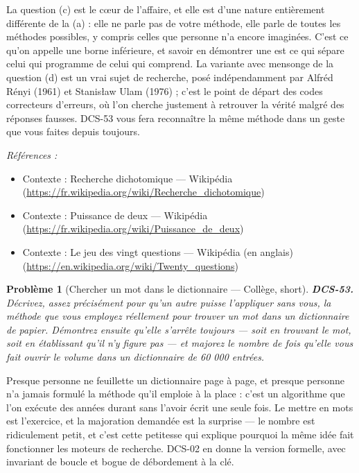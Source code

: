 \documentclass[11pt]{article}
\newtheorem{problem}{Problème}
\newenvironment{refs}{\par\small\noindent\emph{Références :}\begin{itemize}\setlength\itemsep{0pt}}{\end{itemize}\normalsize}
\begin{document}
\noindent La question (c) est le c\oe{}ur de l'affaire, et elle est d'une nature
entièrement différente de la (a) : elle ne parle pas de votre méthode, elle parle de toutes
les méthodes possibles, y compris celles que personne n'a encore imaginées. C'est ce qu'on
appelle une borne inférieure, et savoir en démontrer une est ce qui sépare celui qui
programme de celui qui comprend. La variante avec mensonge de la question (d) est un vrai
sujet de recherche, posé indépendamment par Alfréd Rényi (1961) et Stanis\l{}aw Ulam (1976) ;
c'est le point de départ des codes correcteurs d'erreurs, où l'on cherche justement à
retrouver la vérité malgré des réponses fausses. DCS-53 vous fera reconnaître la même
méthode dans un geste que vous faites depuis toujours.

\begin{refs}
\item Contexte : Recherche dichotomique --- Wikipédia (\url{https://fr.wikipedia.org/wiki/Recherche_dichotomique})
\item Contexte : Puissance de deux --- Wikipédia (\url{https://fr.wikipedia.org/wiki/Puissance_de_deux})
\item Contexte : Le jeu des vingt questions --- Wikipédia (en anglais) (\url{https://en.wikipedia.org/wiki/Twenty_questions})
\end{refs}

\bigskip

\begin{problem}[{Chercher un mot dans le dictionnaire --- Collège, short}]
\textbf{DCS-53.} Décrivez, assez précisément pour qu'un autre puisse
l'appliquer sans vous, la méthode que vous employez réellement pour trouver un mot dans un
dictionnaire de papier. Démontrez ensuite qu'elle s'arrête toujours --- soit en trouvant le
mot, soit en établissant qu'il n'y figure pas --- et majorez le nombre de fois qu'elle vous
fait ouvrir le volume dans un dictionnaire de 60 000 entrées.
\end{problem}

\noindent Presque personne ne feuillette un dictionnaire page à page, et presque
personne n'a jamais formulé la méthode qu'il emploie à la place : c'est un algorithme que
l'on exécute des années durant sans l'avoir écrit une seule fois. Le mettre en mots est
l'exercice, et la majoration demandée est la surprise --- le nombre est ridiculement petit,
et c'est cette petitesse qui explique pourquoi la même idée fait fonctionner les moteurs de
recherche. DCS-02 en donne la version formelle, avec invariant de boucle et bogue de
débordement à la clé.
\end{document}
